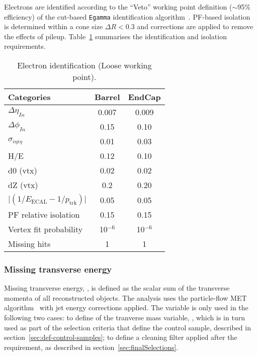 Electrons are identified according to the ``Veto'' working point
definition ($\sim$95\% efficiency) of the cut-based \verb!Egamma!
identification algorithm~\cite{ref:electron-id}. PF-based
isolation~\cite{ref:electron-isolation} is determined within a cone
size $\Delta R < 0.3$ and corrections are applied to remove the effects 
of pileup. Table~\ref{tab:ele-id} summarises the identification 
and isolation requirements. 

\begin{table}[h!]
  \caption{Electron identification (Loose working point).\label{tab:ele-id}}
  \centering
  \footnotesize
  \begin{tabular}{ lcc }
    \hline
    \hline
    Categories                                               & Barrel    & EndCap    \\
    \hline
    $\Delta \eta_{In}$                                       & 0.007     & 0.009     \\
    $\Delta \phi_{In}$                                       & 0.15      & 0.10      \\
    $\sigma_{i\eta i\eta}$                                   & 0.01      & 0.03      \\
    H/E                                                      & 0.12      & 0.10      \\
    d0 (vtx)                                                 & 0.02      & 0.02      \\
    dZ (vtx)                                                 & 0.2       & 0.20      \\
    $\lvert(1/E_{\textrm{ECAL}} - 1/p_{\textrm{trk}})\rvert$ & 0.05      & 0.05      \\
    PF relative isolation                                    & 0.15      & 0.15      \\
    Vertex fit probability                                   & 10$^{-6}$ & 10$^{-6}$ \\
    Missing hits                                             & 1         & 1         \\
    \hline
    \hline
  \end{tabular}
\end{table}


\subsubsection{Missing transverse energy\label{sec:recMET}}

Missing transverse energy, \met, is defined as the scalar sum of the transverse momenta 
of all reconstructed objects. The analysis uses the particle-flow MET 
algorithm~\cite{ref:MET-corrections} with jet energy corrections applied. 
The \met variable is only used in the following two cases: to define of the tranverse mass 
variable, \mt, which is in turn used as part of the selection criteria that define the 
\mj control sample, described in section~\ref{sec:def-control-samples}; to define a 
cleaning filter applied after the \alphat requirement, as described in 
section~\ref{sec:finalSelections}.

